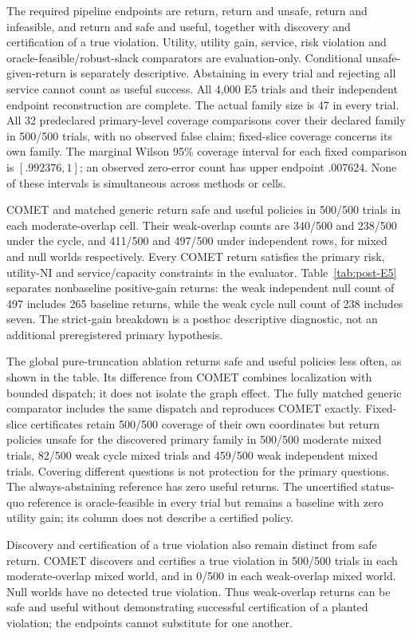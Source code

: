 The required pipeline endpoints are return, return and unsafe, return and
infeasible, and return and safe and useful, together with discovery and
certification of a true violation. Utility, utility gain, service, risk
violation and oracle-feasible/robust-slack comparators are evaluation-only.
Conditional unsafe-given-return is separately descriptive. Abstaining in
every trial and rejecting all service cannot count as useful success.
All 4,000 E5 trials and their independent endpoint reconstruction are complete.
The actual family size is 47 in every trial. All 32 predeclared primary-level coverage
comparisons cover their declared family in 500/500 trials, with no observed
false claim; fixed-slice coverage concerns its own family. The marginal Wilson 95\% coverage interval
for each fixed comparison is $[.992376,1]$; an observed zero-error count has
upper endpoint .007624. None of these intervals is simultaneous across methods
or cells.

COMET and matched generic return safe and useful policies in 500/500 trials
in each moderate-overlap cell. Their weak-overlap counts are 340/500 and
238/500 under the cycle, and 411/500 and 497/500 under independent rows, for
mixed and null worlds respectively. Every COMET return satisfies the primary
risk, utility-NI and service/capacity constraints in the evaluator. Table~\ref{tab:post-E5}
separates nonbaseline positive-gain returns: the weak independent null count
of 497 includes 265 baseline returns, while the weak cycle null count of 238
includes seven. The strict-gain breakdown is a posthoc descriptive diagnostic,
not an additional preregistered primary hypothesis.

The global pure-truncation ablation returns safe and useful policies less
often, as shown in the table. Its difference from COMET combines localization
with bounded dispatch; it does not isolate the graph effect. The fully matched
generic comparator includes the same dispatch and reproduces COMET exactly.
Fixed-slice certificates retain 500/500 coverage of their own coordinates but
return policies unsafe for the discovered primary family in 500/500 moderate
mixed trials, 82/500 weak cycle mixed trials and 459/500 weak independent mixed
trials. Covering different questions is not protection for the primary questions.
The always-abstaining reference has zero useful returns. The uncertified
status-quo reference is oracle-feasible in every trial but remains a baseline
with zero utility gain; its column does not describe a certified policy.

Discovery and certification of a true violation also remain distinct from
safe return. COMET discovers and certifies a true violation in 500/500 trials
in each moderate-overlap mixed world, and in 0/500 in each weak-overlap mixed
world. Null worlds have no detected true violation. Thus weak-overlap returns
can be safe and useful without demonstrating successful certification of a
planted violation; the endpoints cannot substitute for one another.


